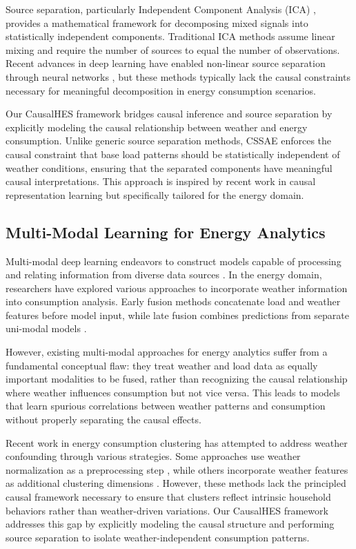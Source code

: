 \documentclass[journal]{IEEEtran}
\begin{document}
Source separation, particularly Independent Component Analysis (ICA) \cite{hyvarinen2000independent}, provides a mathematical framework for decomposing mixed signals into statistically independent components. Traditional ICA methods assume linear mixing and require the number of sources to equal the number of observations. Recent advances in deep learning have enabled non-linear source separation through neural networks \cite{deep_ica_survey}, but these methods typically lack the causal constraints necessary for meaningful decomposition in energy consumption scenarios.

Our CausalHES framework bridges causal inference and source separation by explicitly modeling the causal relationship between weather and energy consumption. Unlike generic source separation methods, CSSAE enforces the causal constraint that base load patterns should be statistically independent of weather conditions, ensuring that the separated components have meaningful causal interpretations. This approach is inspired by recent work in causal representation learning \cite{causal_representation_learning} but specifically tailored for the energy domain.

\subsection{Multi-Modal Learning for Energy Analytics}
Multi-modal deep learning endeavors to construct models capable of processing and relating information from diverse data sources \cite{multi_modal_deep_learning_survey}. In the energy domain, researchers have explored various approaches to incorporate weather information into consumption analysis. Early fusion methods concatenate load and weather features before model input, while late fusion combines predictions from separate uni-modal models \cite{energy_forecasting_survey}.

However, existing multi-modal approaches for energy analytics suffer from a fundamental conceptual flaw: they treat weather and load data as equally important modalities to be fused, rather than recognizing the causal relationship where weather influences consumption but not vice versa. This leads to models that learn spurious correlations between weather patterns and consumption without properly separating the causal effects.

Recent work in energy consumption clustering has attempted to address weather confounding through various strategies. Some approaches use weather normalization as a preprocessing step \cite{weather_normalization_energy}, while others incorporate weather features as additional clustering dimensions \cite{multi_dimensional_energy_clustering}. However, these methods lack the principled causal framework necessary to ensure that clusters reflect intrinsic household behaviors rather than weather-driven variations. Our CausalHES framework addresses this gap by explicitly modeling the causal structure and performing source separation to isolate weather-independent consumption patterns.
\end{document}
